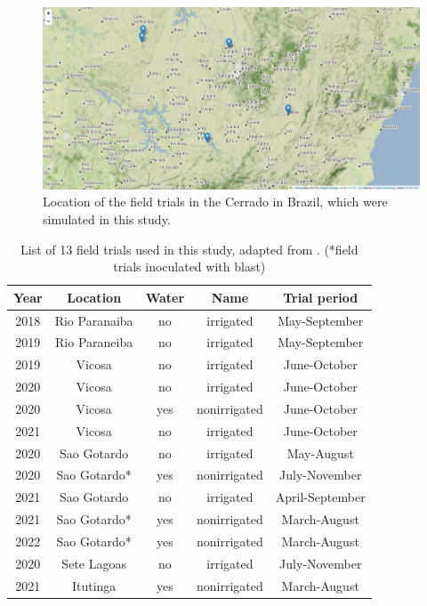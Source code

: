 \documentclass[11pt]{article}
\begin{document}
\begin{figure}[htbp]
\centering
\includegraphics[width=1\textwidth]{./figures/Brazil.png}
\caption{Location of the field trials in the Cerrado in Brazil, which were simulated in this study.}
\end{figure}

\begin{table}[htbp]
\caption{\label{list}List of 13 field trials used in this study, adapted from \cite{casagrande-2023-new-brazil}. (*field trials inoculated with blast)}
\centering
\begin{tabular}{|ccccc|}
\hline
Year & Location & Water & Name & Trial period\\
\hline
\hline
2018 & Rio Paranaiba & no & irrigated & May-September\\
\hline
2019 & Rio Paraneiba & no & irrigated & May-September\\
\hline
2019 & Vicosa & no & irrigated & June-October\\
\hline
2020 & Vicosa & no & irrigated & June-October\\
\hline
2020 & Vicosa & yes & nonirrigated & June-October\\
\hline
2021 & Vicosa & no & irrigated & June-October\\
\hline
2020 & Sao Gotardo & no & irrigated & May-August\\
\hline
2020 & Sao Gotardo* & yes & nonirrigated & July-November\\
\hline
2021 & Sao Gotardo & no & irrigated & April-September\\
\hline
2021 & Sao Gotardo* & yes & nonirrigated & March-August\\
\hline
2022 & Sao Gotardo* & yes & nonirrigated & March-August\\
\hline
2020 & Sete Lagoas & no & irrigated & July-November\\
\hline
2021 & Itutinga & yes & nonirrigated & March-August\\
\hline
\end{tabular}
\end{table}
\end{document}
